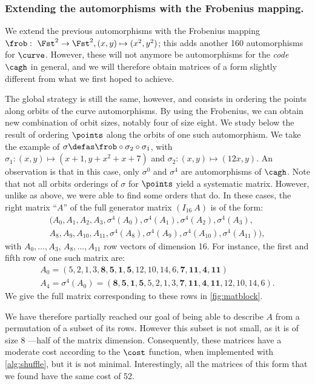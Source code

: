 \subsubsection{Extending the automorphisms with the Frobenius mapping.} We extend the previous automorphisms with the
Frobenius mapping $\frob:~\Fst^2 \rightarrow \Fst^2,\linebreak(x, y) \mapsto (x^2,y^2)$; this adds another 160 automorphisms for $\curve$. However, these will not anymore be
automorphisms for the \emph{code} $\cagh$ in general, and we will therefore obtain matrices of a form slightly different from what we first hoped to achieve.

The global strategy is still the same, however, and consists in ordering the points along orbits of the curve automorphisms.
By using the Frobenius, we can obtain new combination of orbit sizes, notably four of size eight.
We study below the result of ordering $\points$
along the orbits of one such automorphism. We take the example of $\sigma \defas \frob \circ \sigma_2 \circ \sigma_1$, with
$\sigma_1 : (x,y) \mapsto (x + 1, y + x^2 + x + 7)$ and
$\sigma_2 : (x,y) \mapsto (12x, y)$. An observation is that in this case, only $\sigma^0$ and $\sigma^4$ are automorphisms of $\cagh$.
Note that not all orbits orderings of $\sigma$ for $\points$ yield a systematic matrix. However, unlike as above, we were able to find some orders
that do. In these cases, the right matrix ``$A$'' of the full generator matrix $(I_{16}~A)$ is of the form:
\[
\begin{aligned}
(A_0, A_1, A_2, A_3, \sigma^4(A_0), \sigma^4(A_1), \sigma^4(A_2), \sigma^4(A_3),\\
A_8, A_9, A_{10}, A_{11}, \sigma^4(A_8), \sigma^4(A_9), \sigma^4(A_{10}), \sigma^4(A_{11})),
\end{aligned}
\]
with $A_0,\ldots, A_3$, $A_8,\ldots, A_{11}$ row vectors of dimension 16. For instance, the first and fifth row of one such matrix are:
\[
	\begin{aligned}
	A_0 =(5, 2, 1, 3, \mathbf{8, 5, 1, 5}, 12, 10, 14, 6, \mathbf{7, 11, 4, 11})\\
	A_4 = \sigma^4(A_0) = (\mathbf{8, 5, 1, 5}, 5, 2, 1, 3, \mathbf{7, 11, 4, 11}, 12, 10, 14, 6).
	\end{aligned}
\]
We give the full matrix corresponding to these rows in \autoref{fig:matblock}.

We have therefore partially reached our goal of being able to describe $A$ from a permutation of a subset of its rows. However this subset
is not small, as it is of size 8 ---half
of the matrix dimension. Consequently, these matrices have a moderate cost according to the $\cost$ function, when implemented with \autoref{alg:shuffle}, but it is not minimal. Interestingly, all the matrices of this form
that we found have the same cost of 52.


